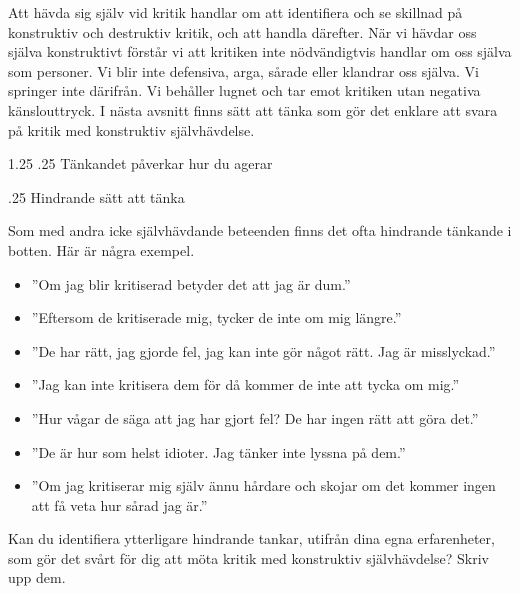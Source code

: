 \documentclass[swedish,a4paper]{book}
\makeatletter
\renewcommand\section{\@startsection{section}{1}{\z@}%
                                   {1.25\baselineskip}%
                                   {.25\baselineskip}%
                                   {\fontsize{1.25\baselineskip}{1.25\baselineskip}\selectfont\sffamily\bfseries}} %
\renewcommand\subsection{\@startsection{subsection}{1}{\z@}%
                                   {\baselineskip}%
                                   {.25\baselineskip}%
                                   {\fontsize{1\baselineskip}{1.25\baselineskip}\selectfont\sffamily\bfseries}} %
\makeatother
\begin{document}
Att hävda sig själv vid kritik handlar om att identifiera och se skillnad på konstruktiv och destruktiv kritik, och att handla därefter. När vi hävdar oss själva konstruktivt förstår vi att kritiken inte nödvändigtvis handlar om oss själva som personer. Vi blir inte defensiva, arga, sårade eller klandrar oss själva. Vi springer inte därifrån. Vi behåller lugnet och tar emot kritiken utan negativa känslouttryck. I nästa avsnitt finns sätt att tänka som gör det enklare att svara på kritik med konstruktiv självhävdelse.

\section{Tänkandet påverkar hur du agerar}

\subsection{Hindrande sätt att tänka}

Som med andra icke självhävdande beteenden finns det ofta hindrande tänkande i botten. Här är några exempel.

\begin{itemize}

\item ''Om jag blir kritiserad betyder det att jag är dum.''

\item ''Eftersom de kritiserade mig, tycker de inte om mig längre.''

\item ''De har rätt, jag gjorde fel, jag kan inte gör något rätt. Jag är misslyckad.''

\item ''Jag kan inte kritisera dem för då kommer de inte att tycka om mig.''

\item ''Hur vågar de säga att jag har gjort fel? De har ingen rätt att göra det.''

\item ''De är hur som helst idioter. Jag tänker inte lyssna på dem.''

\item ''Om jag kritiserar mig själv ännu hårdare och skojar om det kommer ingen att få veta hur sårad jag är.''

\end{itemize}

Kan du identifiera ytterligare hindrande tankar, utifrån dina egna erfarenheter, som gör det svårt för dig att möta kritik med konstruktiv självhävdelse? Skriv upp dem.
\end{document}
